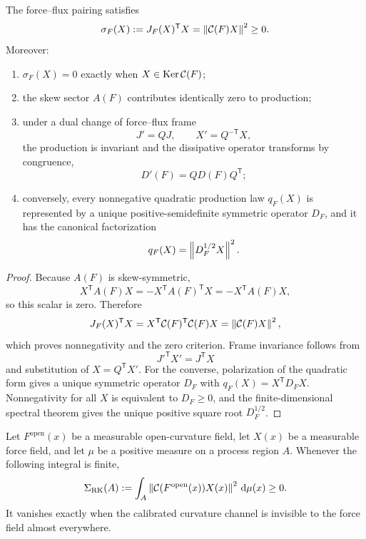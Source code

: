 \begin{theorem}
The force--flux pairing satisfies
\begin{equation}
\sigma_F(X)
:=J_F(X)^{\mathsf T}X
=\left\lVert\mathcal C(F)X\right\rVert^2
\ge0.
\label{eq:calibrated-production}
\end{equation}
Moreover:
\begin{enumerate}[label=(\roman*)]
\item $\sigma_F(X)=0$ exactly when $X\in\operatorname{Ker}\mathcal C(F)$;
\item the skew sector $A(F)$ contributes identically zero to production;
\item under a dual change of force--flux frame
\[
J'=QJ,
\qquad
X'=Q^{-\mathsf T}X,
\]
the production is invariant and the dissipative operator transforms by congruence,
\[
D'(F)=QD(F)Q^{\mathsf T};
\]
\item conversely, every nonnegative quadratic production law $q_F(X)$ is represented by a unique positive-semidefinite symmetric operator $D_F$, and it has the canonical factorization
\[
q_F(X)=\left\lVert D_F^{1/2}X\right\rVert^2.
\]
\end{enumerate}
\end{theorem}

\begin{proof}
Because $A(F)$ is skew-symmetric,
\[
X^{\mathsf T}A(F)X
=-X^{\mathsf T}A(F)^{\mathsf T}X
=-X^{\mathsf T}A(F)X,
\]
so this scalar is zero.  Therefore
\[
J_F(X)^{\mathsf T}X
=X^{\mathsf T}\mathcal C(F)^{\mathsf T}\mathcal C(F)X
=\left\lVert\mathcal C(F)X\right\rVert^2,
\]
which proves nonnegativity and the zero criterion.  Frame invariance follows from
\[
J'^{\mathsf T}X'=J^{\mathsf T}X
\]
and substitution of $X=Q^{\mathsf T}X'$.  For the converse, polarization of the quadratic form gives a unique symmetric operator $D_F$ with $q_F(X)=X^{\mathsf T}D_FX$.  Nonnegativity for all $X$ is equivalent to $D_F\ge0$, and the finite-dimensional spectral theorem gives the unique positive square root $D_F^{1/2}$.
\end{proof}

\begin{corollary}
Let $F^{\mathrm{open}}(x)$ be a measurable open-curvature field, let $X(x)$ be a measurable force field, and let $\mu$ be a positive measure on a process region $A$.  Whenever the following integral is finite,
\begin{equation}
\Sigma_{\mathrm{RK}}(A)
:=\int_A
\left\lVert\mathcal C(F^{\mathrm{open}}(x))X(x)\right\rVert^2\,\mathrm d\mu(x)
\ge0.
\label{eq:integrated-rk-production}
\end{equation}
It vanishes exactly when the calibrated curvature channel is invisible to the force field almost everywhere.
\end{corollary}


